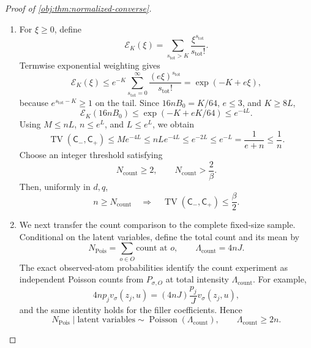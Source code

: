 \begin{proof}[Proof of \cref{obj:thm:normalized-converse}]
\begin{enumerate}
\item
For \(\xi\ge0\), define
\[
\mathcal E_K(\xi)
=\sum_{s_{\mathrm{tot}}>K}
\frac{\xi^{s_{\mathrm{tot}}}}{s_{\mathrm{tot}}!}.
\]
Termwise exponential weighting gives
\[
\mathcal E_K(\xi)
\le e^{-K}\sum_{s_{\mathrm{tot}}=0}^{\infty}
\frac{(e\xi)^{s_{\mathrm{tot}}}}{s_{\mathrm{tot}}!}
=\exp(-K+e\xi),
\]
because \(e^{s_{\mathrm{tot}}-K}\ge1\) on the tail. Since
\(16nB_0=K/64\), \(e\le3\), and \(K\ge8L\),
\[
\mathcal E_K(16nB_0)
\le\exp(-K+eK/64)\le e^{-4L}.
\]
Using \(M\le nL\), \(n\le e^L\), and \(L\le e^L\), we obtain
\[
\operatorname{TV}(\mathsf C_-,\mathsf C_+)
\le Me^{-4L}
\le nLe^{-4L}
\le e^{-2L}
\le e^{-L}
=\frac1{e+n}
\le\frac1n.
\]
Choose an integer threshold satisfying
\[
N_{\mathrm{count}}\ge2,
\qquad
N_{\mathrm{count}}>\frac2\beta.
\]
Then, uniformly in \(d,q\),
\[
n\ge N_{\mathrm{count}}
\quad\Longrightarrow\quad
\operatorname{TV}(\mathsf C_-,\mathsf C_+)\le\frac\beta2.
\]

\item
We next transfer the count comparison to the complete fixed-size sample. Conditional on the latent variables, define the total count and its mean by
\[
N_{\mathrm{Pois}}
=\sum_{o\in O}\text{count at }o,
\qquad
\Lambda_{\mathrm{count}}=4nJ.
\]
The exact observed-atom probabilities identify the count experiment as independent Poisson counts from \(P_{\sigma,O}\) at total intensity
\(\Lambda_{\mathrm{count}}\). For example,
\[
4np_jv_\sigma(z_j,u)
=(4nJ)\frac{p_j}{J}v_\sigma(z_j,u),
\]
and the same identity holds for the filler coefficients. Hence
\[
N_{\mathrm{Pois}}\mid\text{latent variables}
\sim\operatorname{Poisson}(\Lambda_{\mathrm{count}}),
\qquad
\Lambda_{\mathrm{count}}\ge2n.
\]


\end{enumerate}
\end{proof}
